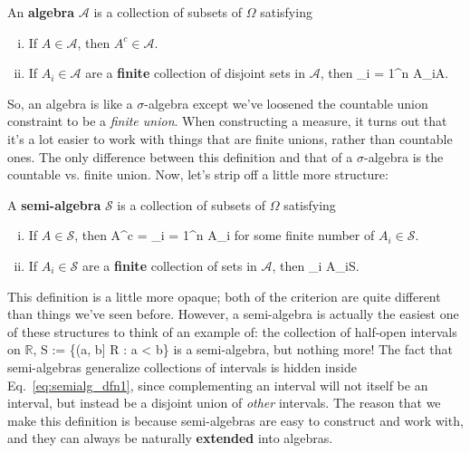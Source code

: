 \begin{definition}[Algebra]
	An \textbf{algebra} $\mathcal A$ is a collection of subsets of $\Omega$ satisfying
	\begin{enumerate}[i)]
		\item If $A\in\mathcal A$, then $A^c\in\mathcal A$. 
		\item If $A_i\in\mathcal A$ are a \textbf{finite} collection of disjoint sets in $\mathcal A$, then
		\eq
			\bigcup_{i = 1}^n A_i\in\mathcal A.
		\qe
	\end{enumerate}
\end{definition}
So, an algebra is like a $\sigma$-algebra except we've loosened the countable union constraint to be a \textit{finite union}. When constructing a measure, it turns out that it's a lot easier to work with things that are finite unions, rather than countable ones. The only difference between this definition and that of a $\sigma$-algebra is the countable vs. finite union. Now, let's strip off a little more structure:
\begin{definition}
	A \textbf{semi-algebra} $\mathcal S$ is a collection of subsets of $\Omega$ satisfying
	\begin{enumerate}[i)]
		\item If $A\in\mathcal S$, then
		\eq
			A^c = \bigsqcup_{i = 1}^n A_i
			\label{eq:semialg_dfn1}
		\qe
		for some finite number of $A_i\in \mathcal S$.
		\item If $A_i\in\mathcal S$ are a \textbf{finite} collection of sets in $\mathcal A$, then
		\eq
			\bigcap_i A_i\in\mathcal S.
		\qe
	\end{enumerate}
\end{definition}
This definition is a little more opaque; both of the criterion are quite different than things we've seen before. However, a semi-algebra is actually the easiest one of these structures to think of an example of: the collection of half-open intervals on $\mathbb R$,
\eq
	\mathcal S := \{(a, b] \subseteq\mathbb R : a < b\}
	\label{eq:r_semialg}
\qe
is a semi-algebra, but nothing more! The fact that semi-algebras generalize collections of intervals is hidden inside Eq.~\eqref{eq:semialg_dfn1}, since complementing an interval will not itself be an interval, but instead be a disjoint union of \textit{other} intervals. The reason that we make this definition is because semi-algebras are easy to construct and work with, and they can always be naturally \textbf{extended} into algebras.

